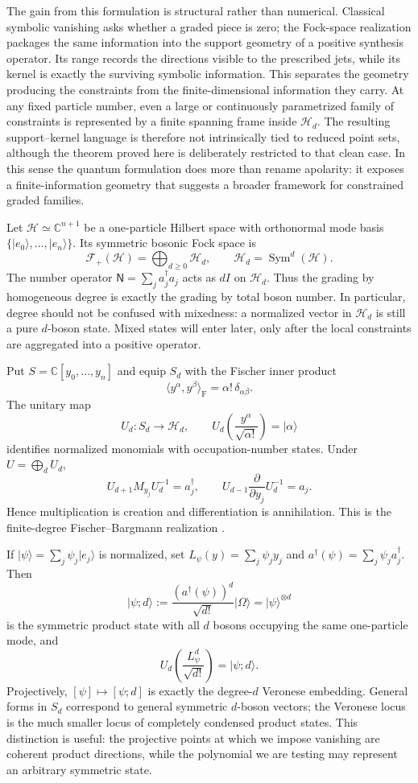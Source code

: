 \documentclass[11pt]{article}
\theoremstyle{remark}
\newcommand{\CC}{\mathbb C}
\newcommand{\Sym}{\operatorname{Sym}}
\newcommand{\HH}{\mathcal H}
\newcommand{\Fock}{\mathcal F_{+}}
\newcommand{\ket}[1]{\lvert #1\rangle}
\begin{document}
The gain from this formulation is structural rather than numerical.  Classical symbolic vanishing asks whether a graded piece is zero; the Fock-space realization packages the same information into the support geometry of a positive synthesis operator.  Its range records the directions visible to the prescribed jets, while its kernel is exactly the surviving symbolic information.  This separates the geometry producing the constraints from the finite-dimensional information they carry.  At any fixed particle number, even a large or continuously parametrized family of constraints is represented by a finite spanning frame inside $\HH_d$.  The resulting support--kernel language is therefore not intrinsically tied to reduced point sets, although the theorem proved here is deliberately restricted to that clean case.  In this sense the quantum formulation does more than rename apolarity: it exposes a finite-information geometry that suggests a broader framework for constrained graded families.

Let $\HH\simeq\CC^{n+1}$ be a one-particle Hilbert space with orthonormal mode basis $\{\ket{e_0},\ldots,\ket{e_n}\}$.  Its symmetric bosonic Fock space is
\[
  \Fock(\HH)=\bigoplus_{d\ge0}\HH_d,
  \qquad
  \HH_d=\Sym^d(\HH).
\]
The number operator $\mathsf N=\sum_j a_j^\dagger a_j$ acts as $dI$ on $\HH_d$.  Thus the grading by homogeneous degree is exactly the grading by total boson number.  In particular, degree should not be confused with mixedness: a normalized vector in $\HH_d$ is still a pure $d$-boson state.  Mixed states will enter later, only after the local constraints are aggregated into a positive operator.

Put $S=\CC[y_0,\ldots,y_n]$ and equip $S_d$ with the Fischer inner product
\[
  \langle y^\alpha,y^\beta\rangle_{\mathrm F}=\alpha!\,\delta_{\alpha\beta}.
\]
The unitary map
\[
  U_d:S_d\longrightarrow\HH_d,
  \qquad
  U_d\!\left(\frac{y^\alpha}{\sqrt{\alpha!}}\right)=\ket{\alpha}
\]
identifies normalized monomials with occupation-number states.  Under $U=\bigoplus_dU_d$,
\[
  U_{d+1}M_{y_j}U_d^{-1}=a_j^\dagger,
  \qquad
  U_{d-1}\frac{\partial}{\partial y_j}U_d^{-1}=a_j.
\]
Hence multiplication is creation and differentiation is annihilation.  This is the finite-degree Fischer--Bargmann realization \cite{Bargmann1961}.

If $\ket\psi=\sum_j\psi_j\ket{e_j}$ is normalized, set $L_\psi(y)=\sum_j\psi_jy_j$ and $a^\dagger(\psi)=\sum_j\psi_ja_j^\dagger$.  Then
\[
  \ket{\psi;d}
  :=\frac{(a^\dagger(\psi))^d}{\sqrt{d!}}\ket\Omega
  =\ket\psi^{\otimes d}
\]
is the symmetric product state with all $d$ bosons occupying the same one-particle mode, and
\[
  U_d\!\left(\frac{L_\psi^d}{\sqrt{d!}}\right)=\ket{\psi;d}.
\]
Projectively, $[\psi]\mapsto[\psi;d]$ is exactly the degree-$d$ Veronese embedding.  General forms in $S_d$ correspond to general symmetric $d$-boson vectors; the Veronese locus is the much smaller locus of completely condensed product states.  This distinction is useful: the projective points at which we impose vanishing are coherent product directions, while the polynomial we are testing may represent an arbitrary symmetric state.
\end{document}
